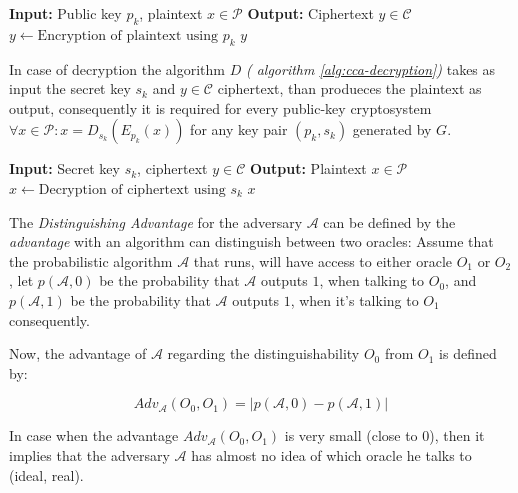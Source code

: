 \documentclass[10pt,a4paper]{article}
\begin{document}
\begin{algorithm}
\caption{Encryption \(E_{p_k}(x)\)}
\begin{algorithmic}[1]
\State \textbf{Input:} Public key \(p_k\), plaintext \(x \in \mathcal{P}\)
\State \textbf{Output:} Ciphertext \(y \in \mathcal{C}\)
\State \(y \gets \text{Encryption of plaintext using } p_k\)
\State \Return \(y\)
\end{algorithmic}\label{alg:cca-enc}
\end{algorithm}


In case of decryption the algorithm $D$ \textit{( algorithm \ref{alg:cca-decryption})} takes as input the secret key $s_k$ and $y \in \mathcal{C}$ ciphertext, than produeces the plaintext as output, consequently it is required for every public-key cryptosystem $\forall x\in \mathcal{P}: x = D_{s_k}(E_{p_k}(x))$ for any key pair $(p_k, s_k)$ generated by $G$.\cite{Damgaard2025}

\begin{algorithm}
\caption{Decryption \(D_{s_k}(y)\)}
\begin{algorithmic}[1]
\State \textbf{Input:} Secret key \(s_k\), ciphertext \(y \in \mathcal{C}\)
\State \textbf{Output:} Plaintext \(x \in \mathcal{P}\)
\State \(x \gets \text{Decryption of ciphertext using } s_k\)
\State \Return \(x\)
\end{algorithmic}
\label{alg:cca-decryption}
\end{algorithm}


The \textit{Distinguishing Advantage} for the adversary
$\mathcal{A}$ can be defined by the \textit{advantage} with an algorithm  can distinguish between two oracles:  Assume that the probabilistic algorithm $\mathcal{A}$  that runs, will have access to either oracle $O_1$ or $O_2$, let $p( \mathcal{A},0)$ be the probability that $\mathcal{A}$ outputs $1$, when talking to $O_0$, and $p( \mathcal{A},1)$ be the probability that $\mathcal{A}$ outputs $1$, when it's talking to $O_1$ consequently.\cite{Damgaard2025}

Now, the advantage of $\mathcal{A}$ regarding the 
distinguishability $O_0$ from $O_1$ is defined by:

\begin{equation}
    Adv_{\mathcal{A}} \left( O_0, O_1\right) = 
    \lvert p(\mathcal{A}, 0)- p(\mathcal{A}, 1) \rvert 
\end{equation}

In case when  the advantage $Adv_{\mathcal{A}} \left( O_0, O_1\right)$ is very small (close to $0$), then it implies that the adversary $\mathcal{A}$ has almost no idea of which oracle he talks to (ideal, real). \cite{Damgaard2025}
\end{document}
